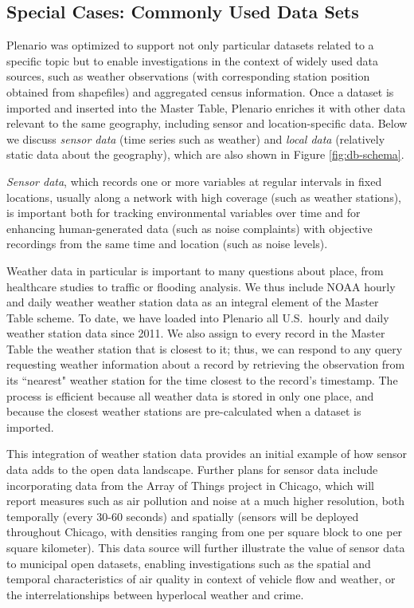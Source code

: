 \documentclass[11pt]{article}
\begin{document}
\subsection{\textbf{Special Cases: Commonly Used Data Sets}}\label{sec:commonly-used-datasets}
Plenario was optimized to support not only particular datasets related to a specific topic but to enable investigations in the context of widely used data sources, such as weather observations (with corresponding station position obtained from shapefiles) and aggregated census information. Once a dataset is imported and inserted into the Master Table, Plenario enriches it with other data relevant to the same geography, including sensor and location-specific data. Below we discuss \textit{sensor data} (time series such as weather) and \textit{local data} (relatively static data about the geography), which are also shown in Figure \ref{fig:db-schema}.

\textit{Sensor data}, which records one or more variables at regular intervals in fixed locations, usually along a network with high coverage (such as weather stations), is important both for tracking environmental variables over time and for enhancing human-generated data (such as noise complaints) with objective recordings from the same time and location (such as noise levels). 

Weather data in particular is important to many questions about place, from healthcare studies to traffic or flooding analysis. We thus include NOAA hourly and daily weather weather station data as an integral element of the Master Table scheme. To date, we have loaded into Plenario all U.S.\ hourly and daily weather station data since 2011.
We also assign to every record in the Master Table the weather station that is closest to it; thus, we can respond to any query requesting weather information about a record by retrieving the observation from its ``nearest" weather station for the time closest to the record's timestamp. The process is efficient because all weather data is stored in only one place, and because the closest weather stations are pre-calculated when a dataset is imported. 

This integration of weather station data provides an initial example of how sensor data adds to the open data landscape.
Further plans for sensor data include incorporating data from the Array of Things \cite{moser_2015} project in Chicago, which will report measures such as air pollution and noise at a much higher resolution, both temporally (every 30-60 seconds) and spatially (sensors will be deployed throughout Chicago, with densities ranging from one per square block to one per square kilometer). This data source will further illustrate the value of sensor data to municipal open datasets, enabling investigations such as the spatial and temporal characteristics of air quality in context of vehicle flow and weather, or the interrelationships between hyperlocal weather and crime.  
\end{document}
